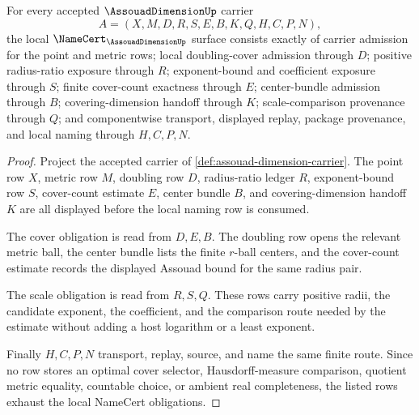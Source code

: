 \begin{theorem}
\label{thm:assouad-dimension-namecert-obligations}
For every accepted $\AssouadDimensionUp$ carrier
$$
A=(X,M,D,R,S,E,B,K,Q,H,C,P,N),
$$
the local $\NameCert_{\AssouadDimensionUp}$ surface consists exactly of carrier admission for the point and metric rows; local doubling-cover admission through $D$; positive radius-ratio exposure through $R$; exponent-bound and coefficient exposure through $S$; finite cover-count exactness through $E$; center-bundle admission through $B$; covering-dimension handoff through $K$; scale-comparison provenance through $Q$; and componentwise transport, displayed replay, package provenance, and local naming through $H,C,P,N$.
\end{theorem}
\begin{proof}
Project the accepted carrier of \autoref{def:assouad-dimension-carrier}. The point row $X$, metric row $M$, doubling row $D$, radius-ratio ledger $R$, exponent-bound row $S$, cover-count estimate $E$, center bundle $B$, and covering-dimension handoff $K$ are all displayed before the local naming row is consumed.

The cover obligation is read from $D,E,B$. The doubling row opens the relevant metric ball, the center bundle lists the finite $r$-ball centers, and the cover-count estimate records the displayed Assouad bound for the same radius pair.

The scale obligation is read from $R,S,Q$. These rows carry positive radii, the candidate exponent, the coefficient, and the comparison route needed by the estimate without adding a host logarithm or a least exponent.

Finally $H,C,P,N$ transport, replay, source, and name the same finite route. Since no row stores an optimal cover selector, Hausdorff-measure comparison, quotient metric equality, countable choice, or ambient real completeness, the listed rows exhaust the local NameCert obligations.
\end{proof}

